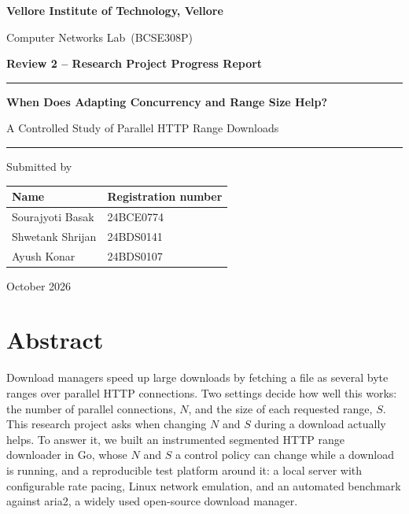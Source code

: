 \documentclass[11pt,a4paper]{report}
\newcommand{\Institute}{Vellore Institute of Technology, Vellore}
\newcommand{\CourseName}{Computer Networks Lab}
\newcommand{\CourseCode}{BCSE308P}
\newcommand{\SubmitDate}{October 2026}
\newcommand{\MemberA}{Sourajyoti Basak} \newcommand{\RegA}{24BCE0774}
\newcommand{\MemberB}{Shwetank Shrijan} \newcommand{\RegB}{24BDS0141}
\newcommand{\MemberC}{Ayush Konar} \newcommand{\RegC}{24BDS0107}
\begin{document}
\begin{titlepage}
\centering\sffamily
\vspace*{0.5cm}
{\Large\bfseries \Institute\par}
\vspace{0.2cm}
\vspace{1.6cm}
{\large \CourseName\ (\CourseCode)\par}
\vspace{0.3cm}
{\large\bfseries Review 2 -- Research Project Progress Report\par}
\vspace{2.0cm}
\rule{\linewidth}{0.8pt}\par\vspace{0.4cm}
{\huge\bfseries When Does Adapting Concurrency and Range Size Help?\par}
\vspace{0.3cm}
{\Large A Controlled Study of Parallel HTTP Range Downloads\par}
\vspace{0.4cm}\rule{\linewidth}{0.8pt}\par
\vspace{2.2cm}
{\large Submitted by\par}
\vspace{0.4cm}
\begin{tabular}{ll}
\toprule
\textbf{Name} & \textbf{Registration number}\\
\midrule
\MemberA & \RegA\\
\MemberB & \RegB\\
\MemberC & \RegC\\
\bottomrule
\end{tabular}
\vspace{1.6cm}


\vfill
{\large \SubmitDate\par}
\end{titlepage}

\tableofcontents
\clearpage\listoffigures
\listoftables
\clearpage
{}

\chapter*{Abstract}
Download managers speed up large downloads by fetching a file as several byte ranges over parallel HTTP connections. Two settings decide how well this works: the number of parallel connections, $N$, and the size of each requested range, $S$. This research project asks when changing $N$ and $S$ during a download actually helps. To answer it, we built an instrumented segmented HTTP range downloader in Go, whose $N$ and $S$ a control policy can change while a download is running, and a reproducible test platform around it: a local server with configurable rate pacing, Linux network emulation, and an automated benchmark against aria2, a widely used open-source download manager.
\end{document}
